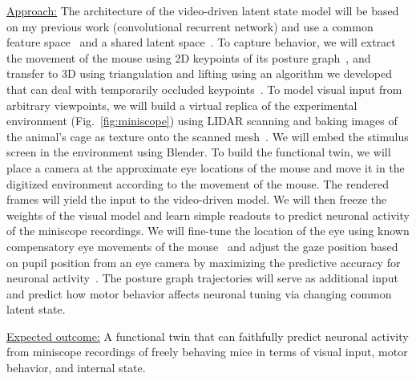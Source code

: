 \documentclass[COG,11pt]{ercgrant}
\begin{document}
\underline{Approach:} 
The architecture of the video-driven latent state model will be based on my previous work (convolutional recurrent network) and use a common feature space~\parencite{Sinz2018-sk} and a shared latent space~\parencite{Bashiri2021-or}. 
To capture behavior, we will extract the movement of the mouse using 2D keypoints of its posture graph~\parencite{Mathis2018-lk}, and transfer to 3D using triangulation and lifting  using an algorithm we developed that can deal with temporarily occluded keypoints~\parencite{Pierzchlewicz2022-tq}. 
To model visual input from arbitrary viewpoints, we will build a virtual replica of the experimental environment (Fig.~\ref{fig:miniscope}) using LIDAR scanning and baking images of the animal's cage as texture onto the scanned mesh~\parencite[Fig.~\ref{fig:replica}]{Holmgren2021-jv}. 
We will embed the stimulus screen in the environment using Blender.
To build the functional twin, we will place a camera at the approximate eye locations of the mouse and move it in the digitized environment according to the movement of the mouse. 
The rendered frames will yield the input to the video-driven model.
We will then freeze the weights of the visual model and learn simple readouts to predict neuronal activity of the miniscope recordings.
We will fine-tune the location of the eye using known compensatory eye movements of the mouse~\parencite{Wallace2013-lf} and adjust the gaze position based on pupil position from an eye camera by maximizing the predictive accuracy for neuronal activity~\parencite[similar to][]{Sinz2018-sk, Parker2022-ac}.
The posture graph trajectories will serve as additional input and predict how motor behavior affects neuronal tuning via changing common latent state. 

\underline{Expected outcome:} A functional twin that can faithfully predict neuronal activity from miniscope recordings of freely behaving mice in terms of visual input, motor behavior,
and internal state.

\end{document}
